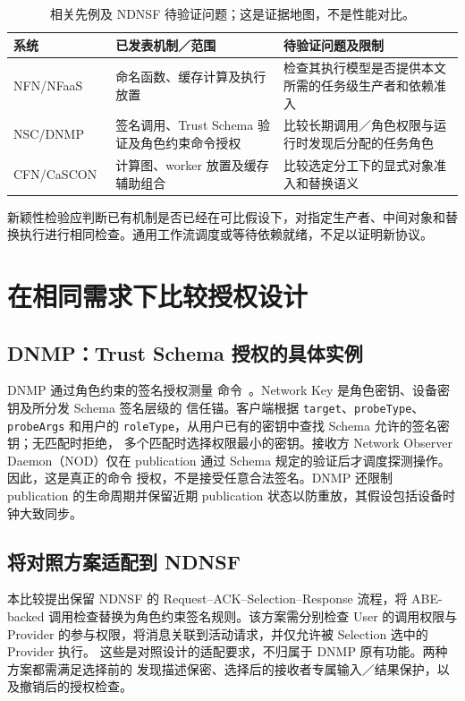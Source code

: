 \begin{table}[htbp]\centering\small
\caption{相关先例及 NDNSF 待验证问题；这是证据地图，不是性能对比。}
\begin{tabularx}{\textwidth}{p{}XX}
\toprule 系统 & 已发表机制／范围 & 待验证问题及限制\\\midrule
NFN/NFaaS~\cite{nfn,nfaas} & 命名函数、缓存计算及执行放置 & 检查其执行模型是否提供本文所需的任务级生产者和依赖准入\\\midrule
NSC/DNMP~\cite{nsc,dnmp} & 签名调用、Trust Schema 验证及角色约束命令授权 & 比较长期调用／角色权限与运行时发现后分配的任务角色\\\midrule
CFN/CaSCON~\cite{cfn,cascon} & 计算图、worker 放置及缓存辅助组合 & 比较选定分工下的显式对象准入和替换语义\\\bottomrule
\end{tabularx}\end{table}

新颖性检验应判断已有机制是否已经在可比假设下，对指定生产者、中间对象和替换执行进行相同检查。通用工作流调度或等待依赖就绪，不足以证明新协议。

\section{在相同需求下比较授权设计}
\subsection{DNMP：Trust Schema 授权的具体实例}
DNMP 通过角色约束的签名授权测量
命令~\cite{dnmp}。Network Key 是角色密钥、设备密钥及所分发 Schema 签名层级的
信任锚。客户端根据 \texttt{target}、\texttt{probeType}、\texttt{probeArgs} 和用户的
\texttt{roleType}，从用户已有的密钥中查找 Schema 允许的签名密钥；无匹配时拒绝，
多个匹配时选择权限最小的密钥。接收方 Network Observer Daemon（NOD）仅在
publication 通过 Schema 规定的验证后才调度探测操作。因此，这是真正的命令
授权，不是接受任意合法签名。DNMP 还限制 publication 的生命周期并保留近期
publication 状态以防重放，其假设包括设备时钟大致同步。

\subsection{将对照方案适配到 NDNSF}
\label{sec:dnmp-alternative-ch}
本比较提出保留 NDNSF 的 Request--ACK--Selection--Response 流程，将 ABE-backed
调用检查替换为角色约束签名规则。该方案需分别检查 User 的调用权限与 Provider
的参与权限，将消息关联到活动请求，并仅允许被 Selection 选中的 Provider 执行。
这些是对照设计的适配要求，不归属于 DNMP 原有功能。两种方案都需满足选择前的
发现描述保密、选择后的接收者专属输入／结果保护，以及撤销后的授权检查。

